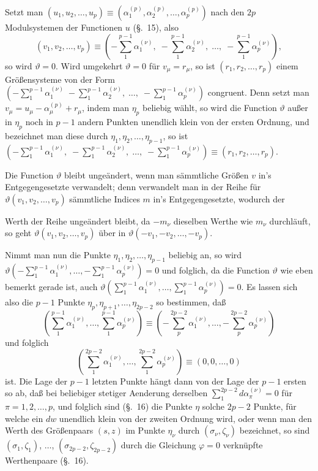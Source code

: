 \documentclass{article}
\begin{document}
Setzt man $(u_{1}, u_{2}, \ldots, u_{p}) \equiv (\alpha_{1}^{(p)}, \alpha_{2}^{(p)}, \ldots, \alpha_{p}^{(p)})$ nach den $2p$ Modulsystemen der Functionen $u$ (§.~15), also
\[ (v_{1}, v_{2}, \ldots, v_{p}) \equiv \left(-\sum_{1}^{p-1} \alpha_{1}^{(\nu)}, \; -\sum_{1}^{p-1} \alpha_{2}^{(\nu)}, \; \ldots, \; -\sum_{1}^{p-1} \alpha_{p}^{(\nu)}\right), \]
so wird $\vartheta = 0$. Wird umgekehrt $\vartheta = 0$ für $v_{\mu} = r_{\mu}$, so ist $(r_{1}, r_{2}, \ldots, r_{p})$ einem Größensysteme von der Form $\left(-\displaystyle\sum_{1}^{p-1} \alpha_{1}^{(\nu)} \; -\sum_{1}^{p-1} \alpha_{2}^{(\nu)}, \; \ldots, \; -\sum_{1}^{p-1} \alpha_{p}^{(\nu)}\right)$ congruent. Denn setzt man $v_{\mu} = u_{\mu} - \alpha_{\mu}^{(p)} + r_{\mu}$, indem man $\eta_{p}$ beliebig wählt, so wird die Function $\vartheta$ außer in $\eta_{p}$ noch in $p-1$ andern Punkten unendlich klein von der ersten Ordnung, und bezeichnet man diese durch $\eta_{1}, \eta_{2}, \ldots, \eta_{p-1}$, so ist $\left(-\displaystyle\sum_{1}^{p-1} \alpha_{1}^{(\nu)}, \; -\sum_{1}^{p-1} \alpha_{2}^{(\nu)}, \; \ldots, \; -\sum_{1}^{p-1} \alpha_{p}^{(\nu)}\right) \equiv (r_{1}, r_{2}, \ldots, r_{p})$.

Die Function $\vartheta$ bleibt ungeändert, wenn man sämmtliche Größen $v$ in's Entgegengesetzte verwandelt; denn verwandelt man in der Reihe für $\vartheta(v_{1}, v_{2}, \ldots, v_{p})$ sämmtliche Indices $m$ in's Entgegengesetzte, wodurch der

Werth der Reihe ungeändert bleibt, da $-m_{\nu}$ dieselben Werthe wie $m_{\nu}$ durchläuft, so geht $\vartheta(v_{1}, v_{2}, \ldots, v_{p})$ über in $\vartheta(-v_{1}, -v_{2}, \ldots, -v_{p})$.

Nimmt man nun die Punkte $\eta_{1}, \eta_{2}, \ldots, \eta_{p-1}$ beliebig an, so wird $\vartheta\left(-\displaystyle\sum_{1}^{p-1} \alpha_{1}^{(\nu)}, \ldots, -\sum_{1}^{p-1} \alpha_{p}^{(\nu)}\right) = 0$ und folglich, da die Function $\vartheta$ wie eben bemerkt gerade ist, auch $\vartheta\left(\displaystyle\sum_{1}^{p-1} \alpha_{1}^{(\nu)}, \ldots, \sum_{1}^{p-1} \alpha_{p}^{(\nu)}\right) = 0$. Es lassen sich also die $p-1$ Punkte $\eta_{p}, \eta_{p+1}, \ldots, \eta_{2p-2}$ so bestimmen, daß
\[ \left(\sum_{1}^{p-1} \alpha_{1}^{(\nu)}, \ldots, \sum_{1}^{p-1} \alpha_{p}^{(\nu)}\right) \equiv \left(-\sum_{p}^{2p-2} \alpha_{1}^{(\nu)}, \ldots, -\sum_{p}^{2p-2} \alpha_{p}^{(\nu)}\right) \]
und folglich
\[ \left(\sum_{1}^{2p-2} \alpha_{1}^{(\nu)}, \ldots, \sum_{1}^{2p-2} \alpha_{p}^{(\nu)}\right) \equiv (0, 0, \ldots, 0) \]
ist. Die Lage der $p-1$ letzten Punkte hängt dann von der Lage der $p-1$ ersten so ab, daß bei beliebiger stetiger Aenderung derselben $\displaystyle\sum_{1}^{2p-2} d\alpha_{\pi}^{(\nu)} = 0$ für $\pi = 1, 2, \ldots, p$, und folglich sind (§.~16) die Punkte $\eta$ solche $2p-2$ Punkte, für welche ein $dw$ unendlich klein von der zweiten Ordnung wird, oder wenn man den Werth des Größenpaars $(s, z)$ im Punkte $\eta_{\nu}$ durch $(\sigma_{\nu}, \zeta_{\nu})$ bezeichnet, so sind $(\sigma_{1}, \zeta_{1})$, $\ldots$, $(\sigma_{2p-2}, \zeta_{2p-2})$ durch die Gleichung $\varphi = 0$ verknüpfte Werthenpaare (§.~16).
\end{document}

